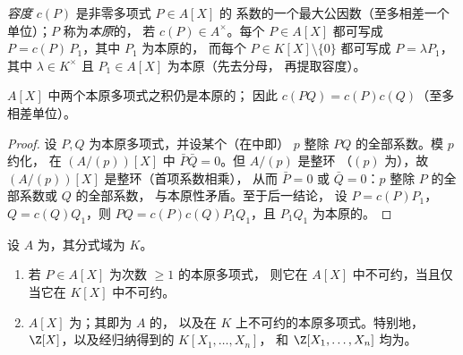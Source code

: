 \begin{definition}\label{def:b3:rings:content}
\emph{容度} $c(P)$ 是非零多项式 $P \in A[X]$ 的
系数的一个最大公因数（至多相差一个单位）；$P$ 称为\emph{本原}的，
若 $c(P) \in A^\times$。每个 $P
\in A[X]$ 都可写成 $P = c(P)\,P_1$，其中 $P_1$ 为本原的，
而每个 $P \in K[X]\setminus\{0\}$ 都可写成 $P = \lambda P_1$，其中 $\lambda
\in K^\times$ 且 $P_1 \in A[X]$ 为本原（先去分母，
再提取容度）。
\end{definition}

\begin{lemma}[高斯]\label{lem:b3:rings:gauss}
$A[X]$ 中两个本原多项式之积仍是本原的；
因此 $c(PQ) = c(P)c(Q)$（至多相差单位）。
\end{lemma}

\begin{proof}
设 $P, Q$ 为本原多项式，并设某个（在中即）
$p$ 整除 $PQ$ 的全部系数。模 $p$ 约化，
在 $(A/(p))[X]$ 中 $\bar P \bar Q = 0$。但 $A/(p)$ 是整环
（$(p)$ 为），故 $(A/(p))[X]$ 是整环（首项系数相乘），
从而 $\bar P = 0$ 或 $\bar Q = 0$：$p$ 整除 $P$ 的全部系数或 $Q$ 的全部系数，
与本原性矛盾。至于后一结论，
设 $P = c(P)P_1$，$Q = c(Q)Q_1$，则 $PQ =
c(P)c(Q) P_1Q_1$，且 $P_1Q_1$ 为本原的。
\end{proof}

\begin{theorem}\label{thm:b3:rings:gaussufd}
设 $A$ 为，其分式域为 $K$。
\begin{enumerate}
  \item 若 $P \in A[X]$ 为次数 $\geq 1$ 的本原多项式，
        则它在 $A[X]$ 中不可约，当且仅当它在 $K[X]$ 中不可约。
  \item $A[X]$ 为；其即为 $A$ 的，
        以及在 $K$ 上不可约的本原多项式。特别地，
        $\Z[X]$，以及经归纳得到的 $K[X_1, \dots, X_n]$，
        和 $\Z[X_1, \dots, X_n]$ 均为。
\end{enumerate}
\end{theorem}

